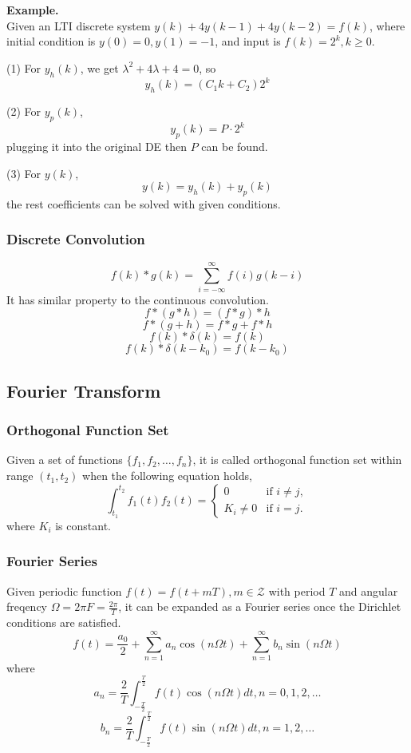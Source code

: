  {\bf Example.}\\
 Given an LTI discrete system $y(k) + 4y(k-1) + 4y(k-2) = f(k)$, where
 initial condition is $y(0) = 0, y(1) = -1$, and input is $f(k)=2^k, k\geq 0$.

 (1) For $y_h(k)$, we get $\lambda^2+4\lambda+4=0$, so
 \[ y_h(k) = (C_1k + C_2)2^k\]

 (2) For $y_p(k)$,
 \[ y_p(k) = P\cdot 2^k\]
 plugging it into the original DE then $P$ can be found.

 (3) For $y(k)$,
 \[ y(k) = y_h(k) + y_p(k)\]
 the rest coefficients can be solved with given conditions.

 \subsubsection{Discrete Convolution}
 \[ f(k) * g(k) = \sum^\infty_{i = -\infty} f(i)g(k-i)\]
 It has similar property to the continuous convolution.
 \[ f * (g * h) = (f * g) * h\]
 \[ f * (g + h) = f * g + f * h\]
 \[ f(k) * \delta(k) = f(k)\] 
 \[ f(k) * \delta(k-k_0) = f(k-k_0)\]

\subsection{Fourier Transform}

 \subsubsection{Orthogonal Function Set}
 Given a set of functions $\{f_1, f_2, \ldots, f_n\}$, it is
 called orthogonal function set within range $(t_1, t_2)$
 when the following equation holds,
 \[ \int^{t_2}_{t_1} f_1(t)f_2(t) = \left\{ 
	 \begin{array}{cl}
	 0 & \text{if } i \neq j,\\
	 K_i \neq 0 & \text{if } i = j.
 \end{array} \right. \]
 where $K_i$ is constant.

 \subsubsection{Fourier Series}
 Given periodic function $f(t) = f(t+mT), m \in \mathcal{Z}$ with period $T$
 and angular freqency $\Omega=2\pi F=\frac{2\pi}{T}$, it can be expanded as
 a Fourier series once the Dirichlet conditions are satisfied.
 \[ f(t) = \frac{a_0}{2}
	 + \sum^\infty_{n=1} a_n \cos(n\Omega t)
	 + \sum^\infty_{n=1} b_n \sin(n\Omega t)
 \]
 where
 \[ a_n = \frac{2}{T} \int_{-\frac{T}{2}}^{\frac{T}{2}}
          f(t)\cos(n\Omega t)dt , n = 0,1,2,\ldots\]
 \[ b_n = \frac{2}{T} \int_{-\frac{T}{2}}^{\frac{T}{2}}
          f(t)\sin(n\Omega t)dt , n = 1,2,\ldots\]

